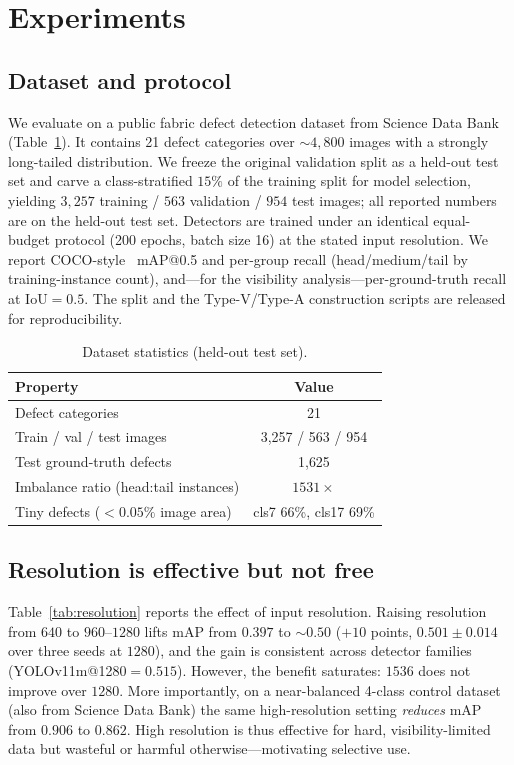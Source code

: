 \section{Experiments}
\label{sec:exp}

\subsection{Dataset and protocol}
We evaluate on a public fabric defect detection dataset from Science Data
Bank~\cite{scidb_fabric}
(Table~\ref{tab:data}). It contains 21 defect categories over ${\sim}4{,}800$
images with a strongly long-tailed distribution. We freeze the original
validation split as a held-out test set and carve a class-stratified $15\%$ of
the training split for model selection, yielding $3{,}257$ training / $563$
validation / $954$ test images; all reported numbers are on the held-out test
set. Detectors are trained under an identical equal-budget protocol
(200 epochs, batch size 16) at the stated input resolution. We report
COCO-style~\cite{coco} mAP@0.5 and per-group recall (head/medium/tail by training-instance
count), and---for the visibility analysis---per-ground-truth recall at
IoU${=}0.5$. The split and the Type-V/Type-A construction scripts are released
for reproducibility.

\begin{table}[t]
\centering
\caption{Dataset statistics (held-out test set).}
\label{tab:data}
\begin{tabular}{lc}
\toprule
Property & Value \\
\midrule
Defect categories & 21 \\
Train / val / test images & 3{,}257 / 563 / 954 \\
Test ground-truth defects & 1{,}625 \\
Imbalance ratio (head:tail instances) & $1531\times$ \\
Tiny defects ($<0.05\%$ image area) & cls7 66\%, cls17 69\% \\
\bottomrule
\end{tabular}
\end{table}

\subsection{Resolution is effective but not free}
Table~\ref{tab:resolution} reports the effect of input resolution. Raising
resolution from $640$ to $960$--$1280$ lifts mAP from $0.397$ to ${\sim}0.50$
($+10$ points, $0.501{\pm}0.014$ over three seeds at $1280$), and the gain is
consistent across detector families (YOLOv11m@1280${=}0.515$). However, the
benefit saturates: $1536$ does not improve over $1280$. More importantly, on a
near-balanced 4-class control dataset (also from Science Data Bank) the same high-resolution setting
\emph{reduces} mAP from $0.906$ to $0.862$. High resolution is thus effective
for hard, visibility-limited data but wasteful or harmful otherwise---motivating
selective use.

